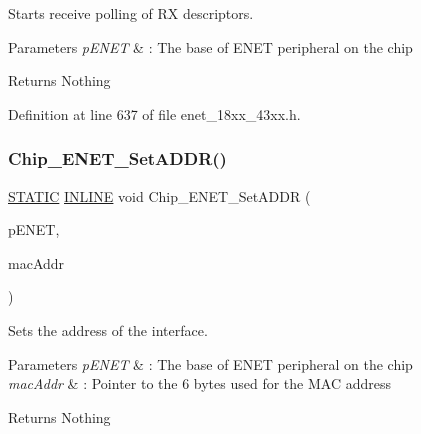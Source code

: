 Starts receive polling of RX descriptors. 


\begin{DoxyParams}{Parameters}
{\em p\+E\+N\+ET} & \+: The base of E\+N\+ET peripheral on the chip \\
\hline
\end{DoxyParams}
\begin{DoxyReturn}{Returns}
Nothing 
\end{DoxyReturn}


Definition at line 637 of file enet\+\_\+18xx\+\_\+43xx.\+h.

\mbox{\label{group___e_n_e_t__18_x_x__43_x_x_ga6d915db1de0ba98ac0cdb1df8c59515b}} 
\subsubsection{\texorpdfstring{Chip\+\_\+\+E\+N\+E\+T\+\_\+\+Set\+A\+D\+D\+R()}{Chip\_ENET\_SetADDR()}}
{\footnotesize\ttfamily \hyperlink{group___l_p_c___types___public___macros_ga10b2d890d871e1489bb02b7e70d9bdfb}{S\+T\+A\+T\+IC} \hyperlink{spifi__18xx__43xx_8h_a2eb6f9e0395b47b8d5e3eeae4fe0c116}{I\+N\+L\+I\+NE} void Chip\+\_\+\+E\+N\+E\+T\+\_\+\+Set\+A\+D\+DR (\begin{DoxyParamCaption}\item[{\hyperlink{struct_l_p_c___e_n_e_t___t}{L\+P\+C\+\_\+\+E\+N\+E\+T\+\_\+T} $\ast$}]{p\+E\+N\+ET,  }\item[{const uint8\+\_\+t $\ast$}]{mac\+Addr }\end{DoxyParamCaption})}



Sets the address of the interface. 


\begin{DoxyParams}{Parameters}
{\em p\+E\+N\+ET} & \+: The base of E\+N\+ET peripheral on the chip \\
\hline
{\em mac\+Addr} & \+: Pointer to the 6 bytes used for the M\+AC address \\
\hline
\end{DoxyParams}
\begin{DoxyReturn}{Returns}
Nothing 
\end{DoxyReturn}


